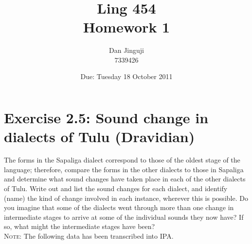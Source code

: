 \documentclass[12pt]{article}
\begin{document}
\title{Ling 454 \\ Homework 1}
\author{Dan Jinguji \\ 7339426}
\date{Due: Tuesday 18 October 2011}

\maketitle

\renewcommand\thesection {\arabic{section}:}
\renewcommand\thesubsection {(\alph{subsection})}
\newcommand{\and}{\,\&\;}
\newcommand{\llb}{\ensuremath{\llbracket}}
\newcommand{\rrb}{\ensuremath{\rrbracket}}
\newcommand{\blt}{\ensuremath{\bullet\;}}
\newcommand{\sem}[1]{\ensuremath{\llbracket\mathrm{#1}\rrbracket}}
\newcommand{\und}{\ensuremath{\_\,}}
\newcommand{\then}{\ensuremath{\rightarrow}}
\newcommand{\dom}[1]{\ensuremath{\mathbf{D}_{\mathrm{#1}}}}
\newcommand{\lamb}[3]{{[\ensuremath{\lambda\mathrm{#1}\;\in\;{#2}\;.\;}{#3}]}}
\newcommand{\ip}[1]{\textipa{#1}}
\newcommand{\rd}{\textrtaild}

\section{Exercise 2.5: Sound change in dialects of Tulu (Dravidian)}

The forms in the Sapaliga dialect correspond to those of the oldest stage of the language; therefore, compare the forms in the other dialects to those in Sapaliga and determine what sound changes have taken place in each of the other dialects of Tulu. Write out and list the sound changes for each dialect, and identify (name) the kind of change involved in each instance, wherever this is possible. Do you imagine that some of the dialects went through more than one change in intermediate stages to arrive at some of the individual sounds they now have? If so, what might the intermediate stages have been? \\
\textsc{Note}: The following data has been transcribed into IPA. \\
\end{document}
